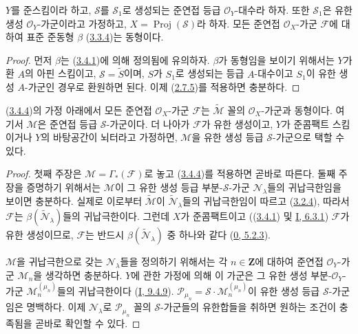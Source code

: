 \begin{theorem}[3.4.4]
\label{II.3.4.4-ko}
$Y$를 준스킴이라 하고, $\mathcal{S}$를 $\mathcal{S}_1$로 생성되는
준연접 등급 $\mathcal{O}_Y$-대수라 하자. 또한 $\mathcal{S}_1$은 유한
생성 $\mathcal{O}_Y$-가군이라고 가정하고,
$X=\operatorname{Proj}(\mathcal{S})$라 하자. 모든
준연접 $\mathcal{O}_X$-가군 $\mathcal{F}$에 대하여 표준 준동형
$\beta$ (\hyperref[II.3.3.4-ko]{3.3.4})는 동형이다.
\end{theorem}

\begin{proof}
먼저 $\beta$는 (\hyperref[II.3.4.1-ko]{3.4.1})에 의해 정의됨에 유의하자.
$\beta$가 동형임을 보이기 위해서는 $Y$가 환 $A$의 아핀 스킴이고,
$\mathcal{S}=\widetilde{S}$이며, $S$가 $S_1$로 생성되는 등급 $A$-대수이고
$S_1$이 유한 생성 $A$-가군인 경우로 환원하면 된다. 이제
(\hyperref[II.2.7.5-ko]{2.7.5})를 적용하면 충분하다.
\end{proof}

\begin{corollary}[3.4.5]
\label{II.3.4.5-ko}
(\hyperref[II.3.4.4-ko]{3.4.4})의 가정 아래에서 모든 준연접
$\mathcal{O}_X$-가군 $\mathcal{F}$는 $\widetilde{\mathcal{M}}$ 꼴의
$\mathcal{O}_X$-가군과 동형이다. 여기서 $\mathcal{M}$은 준연접 등급
$\mathcal{S}$-가군이다. 더 나아가 $\mathcal{F}$가 유한 생성이고,
$Y$가 준콤팩트 스킴이거나 $Y$의 바탕공간이 뇌터라고 가정하면,
$\mathcal{M}$을 유한 생성 등급 $\mathcal{S}$-가군으로 택할 수 있다.
\end{corollary}


\begin{proof}
첫째 주장은 $\mathcal{M}=\Gamma_*(\mathcal{F})$로 놓고
(\hyperref[II.3.4.4-ko]{3.4.4})를 적용하면 곧바로 따른다. 둘째 주장을
증명하기 위해서는 $\mathcal{M}$이 그 유한 생성 등급
부분-$\mathcal{S}$-가군 $\mathcal{N}_\lambda$들의 귀납극한임을 보이면
충분하다. 실제로 이로부터 $\widetilde{\mathcal{M}}$이
$\widetilde{\mathcal{N}}_\lambda$들의 귀납극한임이 따르고
(\hyperref[II.3.2.4-ko]{3.2.4}), 따라서 $\mathcal{F}$는
$\beta(\widetilde{\mathcal{N}}_\lambda)$들의 귀납극한이다. 그런데 $X$가
준콤팩트이고 ((\hyperref[II.3.4.1-ko]{3.4.1}) 및
\hyperref[I.6.3.1-ko]{I, 6.3.1}) $\mathcal{F}$가 유한 생성이므로,
$\mathcal{F}$는 반드시 $\beta(\widetilde{\mathcal{N}}_\lambda)$ 중 하나와
같다 (\hyperref[0.5.2.3-ko]{0, 5.2.3}).

$\mathcal{M}$을 귀납극한으로 갖는 $\mathcal{N}_\lambda$들을 정의하기
위해서는 각 $n\in\mathbf{Z}$에 대하여 준연접 $\mathcal{O}_Y$-가군
$\mathcal{M}_n$을 생각하면 충분하다. $Y$에 관한 가정에 의해 이 가군은
그 유한 생성 부분-$\mathcal{O}_Y$-가군
$\mathcal{M}_n^{(\mu_n)}$들의 귀납극한이다
(\hyperref[I.9.4.9-ko]{I, 9.4.9}).
$\mathcal{P}_{\mu_n}=\mathcal{S}\cdot\mathcal{M}_n^{(\mu_n)}$이 유한 생성
등급 $\mathcal{S}$-가군임은 명백하다. 이제 $\mathcal{N}_\lambda$로
$\mathcal{P}_{\mu_n}$ 꼴의 $\mathcal{S}$-가군들의 유한합들을 취하면
원하는 조건이 충족됨을 곧바로 확인할 수 있다.
\end{proof}

